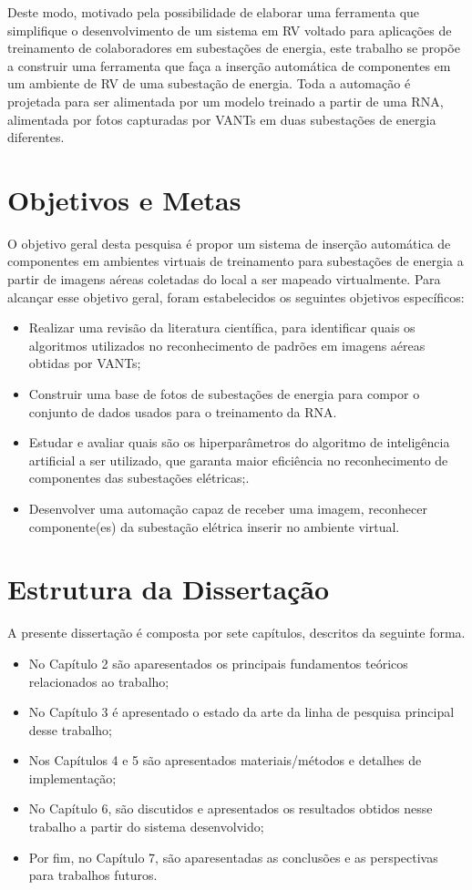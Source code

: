 Deste modo, motivado pela possibilidade de elaborar uma ferramenta que simplifique o desenvolvimento de um sistema em RV voltado para aplicações de treinamento de colaboradores em subestações de energia, este trabalho se propõe a construir uma ferramenta que faça a inserção automática de componentes em um ambiente de RV de uma subestação de energia. Toda a automação é projetada para ser alimentada por um modelo treinado a partir de uma RNA, alimentada por fotos capturadas por VANTs em duas subestações de energia diferentes.

\section{Objetivos e Metas}

O objetivo geral desta pesquisa é propor um sistema de inserção automática de componentes em ambientes virtuais de treinamento para subestações de energia a partir  de imagens aéreas coletadas do local a ser mapeado virtualmente. Para alcançar esse objetivo geral, foram estabelecidos os seguintes objetivos específicos:

\begin{itemize}
\item Realizar uma revisão da literatura científica, para identificar quais os algoritmos utilizados no reconhecimento de padrões em imagens aéreas obtidas por VANTs;
\item Construir uma base de fotos de subestações de energia para compor o conjunto de dados usados para o treinamento da RNA.
\item Estudar e avaliar quais são os hiperparâmetros do algoritmo de inteligência artificial a ser utilizado, que garanta maior eficiência no reconhecimento de componentes das subestações elétricas;.
\item Desenvolver uma automação capaz de receber uma imagem, reconhecer componente(es) da subestação elétrica inserir no ambiente virtual.
\end{itemize}

\section{Estrutura da Dissertação}

A presente dissertação é composta por sete capítulos, descritos da seguinte forma.
\begin{itemize}
\item No Capítulo 2 são aparesentados os principais fundamentos teóricos relacionados ao trabalho;
\item No Capítulo 3 é apresentado o estado da arte da linha de pesquisa principal desse trabalho;
\item Nos Capítulos 4 e 5 são apresentados materiais/métodos e detalhes de implementação;
\item No Capítulo 6, são discutidos e apresentados os resultados obtidos nesse trabalho a partir do sistema desenvolvido;
\item Por fim, no Capítulo 7, são aparesentadas as conclusões e as perspectivas para trabalhos futuros.
\end{itemize}




